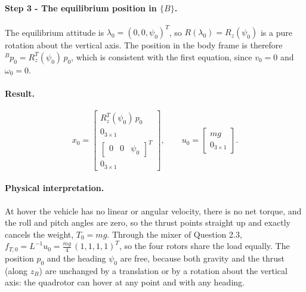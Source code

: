 \paragraph{Step 3 - The equilibrium position in $\{B\}$.}
The equilibrium attitude is $\lambda_0 = (0, 0, \psi_0)^T$, so $R(\lambda_0) = R_z(\psi_0)$ is a pure rotation about the vertical axis.
The position in the body frame is therefore ${}^B p_0 = R_z^T(\psi_0)\, p_0$, which is consistent with the first equation, since $v_0 = 0$ and $\omega_0 = 0$.

\paragraph{Result.}
\begin{equation*}
x_0 = \begin{bmatrix} R_z^T(\psi_0)\, p_0 \\ 0_{3\times 1} \\ \begin{bmatrix} 0 & 0 & \psi_0 \end{bmatrix}^T \\ 0_{3\times 1} \end{bmatrix}, \qquad
u_0 = \begin{bmatrix} m g \\ 0_{3\times 1} \end{bmatrix}.
\end{equation*}

\paragraph{Physical interpretation.}
At hover the vehicle has no linear or angular velocity, there is no net torque, and the roll and pitch angles are zero, so the thrust points straight up and exactly cancels the weight, $T_0 = m g$.
Through the mixer of Question 2.3, $f_{T,0} = L^{-1} u_0 = \tfrac{m g}{4}\,(1, 1, 1, 1)^T$, so the four rotors share the load equally.
The position $p_0$ and the heading $\psi_0$ are free, because both gravity and the thrust (along $z_B$) are unchanged by a translation or by a rotation about the vertical axis: the quadrotor can hover at any point and with any heading.
